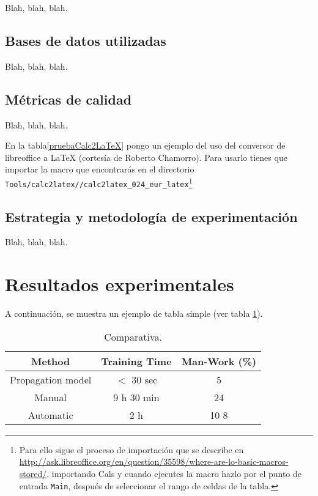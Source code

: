 Blah, blah, blah.


\subsection{Bases de datos utilizadas}
\label{sec:bases-de-datos-1}

Blah, blah, blah.


\subsection{Métricas de calidad}
\label{sec:metricas-de-calidad}

Blah, blah, blah.

En la tabla\ref{pruebaCalc2LaTeX} pongo un ejemplo del uso del conversor de libreoffice a \LaTeX{} (cortesía de Roberto Chamorro). Para usarlo tienes que importar la macro que encontrarás en el directorio \texttt{Tools/calc2latex//calc2latex\_024\_eur\_latex}\footnote{Para ello sigue el proceso de importación que se describe en \url{http://ask.libreoffice.org/en/question/35598/where-are-lo-basic-macros-stored/}, importando Cals y cuando ejecutes la macro hazlo por el punto de entrada \texttt{Main}, después de seleccionar el rango de celdas de la tabla.}




\subsection{Estrategia y metodología de experimentación}
\label{sec:estr-y-metod}

Blah, blah, blah.


\section{Resultados experimentales}
\label{sec:result-experim}

A continuación, se muestra un ejemplo de tabla simple (ver tabla \ref{tab:table1}).

\begin{table}
  \renewcommand{\arraystretch}{1.3}
  \caption{Comparativa.}
  \label{tab:table1}
  \begin{center}
    \begin{tabular}{|c|c|c|}
      \hline
      Method & Training Time & Man-Work (\%)\\
      \hline
      Propagation model & $<$ 30 sec & 5\\
      \hline
      Manual & 9 h 30 min & 24\\
      \hline
      Automatic & 2 h & 10 8\\
      \hline
    \end{tabular}
  \end{center}
\end{table}

